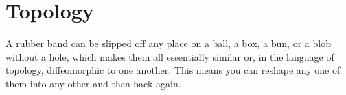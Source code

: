 \chapter{Topology}

A rubber band can be slipped off any place on a ball, a box, a bun,  or a blob without a hole, which makes them all essentially similar  or, in the language of topology, diffeomorphic to one another. This  means you can reshape any one of them into any other and then  back again.



